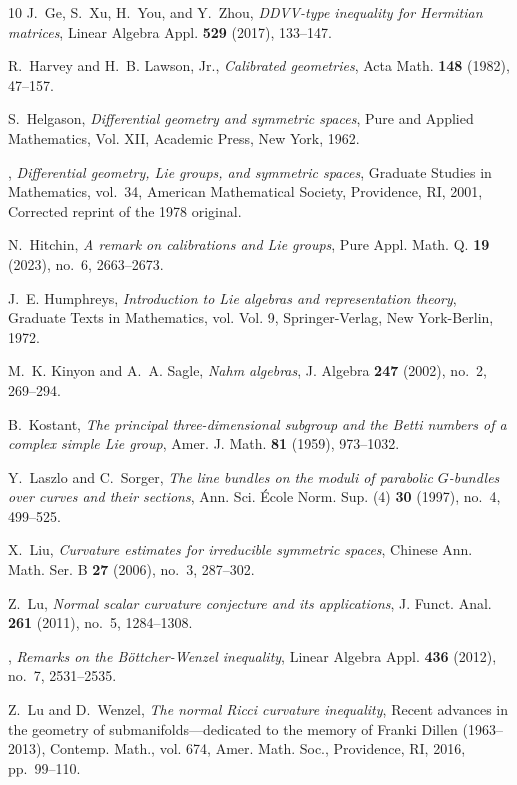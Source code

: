 \documentclass[leqno,10pt]{amsart}
\theoremstyle{definition}
\numberwithin{equation}{section}
\begin{document}
\begin{thebibliography}{10}
J.~Ge, S.~Xu, H.~You, and Y.~Zhou, \emph{{DDVV}-type inequality for {H}ermitian
  matrices}, Linear Algebra Appl. \textbf{529} (2017), 133--147.

R.~Harvey and H.~B. Lawson, Jr., \emph{Calibrated geometries}, Acta Math.
  \textbf{148} (1982), 47--157.

S.~Helgason, \emph{Differential geometry and symmetric spaces}, Pure and
  Applied Mathematics, Vol. XII, Academic Press, New York, 1962.

\bysame, \emph{Differential geometry, {L}ie groups, and symmetric spaces},
  Graduate Studies in Mathematics, vol.~34, American Mathematical Society,
  Providence, RI, 2001, Corrected reprint of the 1978 original.

N.~Hitchin, \emph{A remark on calibrations and {L}ie groups}, Pure Appl. Math.
  Q. \textbf{19} (2023), no.~6, 2663--2673.

J.~E. Humphreys, \emph{Introduction to {L}ie algebras and representation
  theory}, Graduate Texts in Mathematics, vol. Vol. 9, Springer-Verlag, New
  York-Berlin, 1972.

M.~K. Kinyon and A.~A. Sagle, \emph{Nahm algebras}, J. Algebra \textbf{247}
  (2002), no.~2, 269--294.

B.~Kostant, \emph{The principal three-dimensional subgroup and the {B}etti
  numbers of a complex simple {L}ie group}, Amer. J. Math. \textbf{81} (1959),
  973--1032.

Y.~Laszlo and C.~Sorger, \emph{The line bundles on the moduli of parabolic
  {$G$}-bundles over curves and their sections}, Ann. Sci. \'Ecole Norm. Sup.
  (4) \textbf{30} (1997), no.~4, 499--525.

X.~Liu, \emph{Curvature estimates for irreducible symmetric spaces}, Chinese
  Ann. Math. Ser. B \textbf{27} (2006), no.~3, 287--302.

Z.~Lu, \emph{Normal scalar curvature conjecture and its applications}, J.
  Funct. Anal. \textbf{261} (2011), no.~5, 1284--1308.

\bysame, \emph{Remarks on the {B}\"ottcher-{W}enzel inequality}, Linear Algebra
  Appl. \textbf{436} (2012), no.~7, 2531--2535.

Z.~Lu and D.~Wenzel, \emph{The normal {R}icci curvature inequality}, Recent
  advances in the geometry of submanifolds---dedicated to the memory of
  {F}ranki {D}illen (1963--2013), Contemp. Math., vol. 674, Amer. Math. Soc.,
  Providence, RI, 2016, pp.~99--110.


\end{thebibliography}
\end{document}
